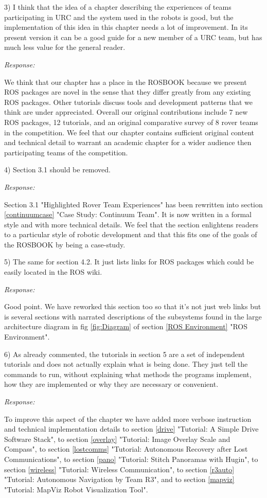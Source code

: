\documentclass[runningheads,a4paper]{llncs}
\newcommand{\rsp}{\noindent \textit{Response:}}
\begin{document}
3)  I think that the idea of a chapter describing the experiences of teams participating in URC and the system used in the robots is good, but the implementation of this idea in this chapter needs a lot of improvement. In its present version it can be a good guide for a new member of a URC team, but has much less value for the general reader. 

\rsp

We think that our chapter has a place in the ROSBOOK because we present ROS packages are novel in the sense that they differ greatly from any existing ROS packages. Other tutorials discuss tools and development patterns that we think are under appreciated. Overall our original contributions include 7 new ROS packages, 12 tutorials, and an original comparative survey of 8 rover teams in the competition. We feel that our chapter contains sufficient original content and technical detail to warrant an academic chapter for a wider audience then participating teams of the competition.

4)  Section 3.1 should be removed.

\rsp

Section 3.1 "Highlighted Rover Team Experiences" has been rewritten into section \ref{continuumcase} "Case Study: Continuum Team". It is now written in a formal style and with more technical details. We feel that the section enlightens readers to a particular style of robotic development and that this fits one of the goals of the ROSBOOK by being a case-study.

5)  The same for section 4.2. It just lists links for ROS packages which could be easily located in the ROS wiki.

\rsp

Good point. We have reworked this section too so that it's not just web links but is several sections with narrated descriptions of the subsystems found in the large architecture diagram in fig \ref{fig:Diagram} of section \ref{ROS Environment} "ROS Environment".

6)  As already commented, the tutorials in section 5 are a set of independent tutorials and does not actually explain what is being done.  They just tell the commands to run, without explaining what methods the programs implement, how they are implemented or why they are necessary or convenient.

\rsp

To improve this aspect of the chapter we have added more verbose instruction and technical implementation details to section \ref{drive} "Tutorial: A Simple Drive Software Stack", to section \ref{overlay} "Tutorial: Image Overlay Scale and Compass", to section \ref{lostcomms} "Tutorial: Autonomous Recovery after Lost Communications", to section \ref{pano} "Tutorial: Stitch Panoramas with Hugin", to section \ref{wireless} "Tutorial: Wireless Communication", to section \ref{r3auto} "Tutorial: Autonomous Navigation by Team R3", and to section \ref{mapviz} "Tutorial: MapViz Robot Visualization Tool".
\end{document}
